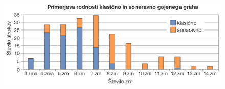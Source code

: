 \begin{frame}
\begin{columns}
\begin{block}{}
\begin{figure}[H]
                    \includegraphics[scale=0.19]{../../Slike_in_skice/1096.jpg}
                \end{figure}
            \end{block}

        \end{columns}

        \end{frame}

